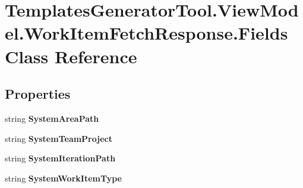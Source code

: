 \hypertarget{class_templates_generator_tool_1_1_view_model_1_1_work_item_fetch_response_1_1_fields}{}\section{Templates\+Generator\+Tool.\+View\+Model.\+Work\+Item\+Fetch\+Response.\+Fields Class Reference}
\label{class_templates_generator_tool_1_1_view_model_1_1_work_item_fetch_response_1_1_fields}
\subsection*{Properties}
\begin{DoxyCompactItemize}
\item 
\mbox{\label{class_templates_generator_tool_1_1_view_model_1_1_work_item_fetch_response_1_1_fields_a45623af0ca1600dc00d35269ee5b2209}} 
string {\bfseries System\+Area\+Path}
\item 
\mbox{\label{class_templates_generator_tool_1_1_view_model_1_1_work_item_fetch_response_1_1_fields_ab40188df9e1fa8177bb741265ed07ad4}} 
string {\bfseries System\+Team\+Project}
\item 
\mbox{\label{class_templates_generator_tool_1_1_view_model_1_1_work_item_fetch_response_1_1_fields_a78a514576cd11f399b6714617f1665e0}} 
string {\bfseries System\+Iteration\+Path}
\item 
\mbox{\label{class_templates_generator_tool_1_1_view_model_1_1_work_item_fetch_response_1_1_fields_af3184f4764f1accc54ea222cf5d6823b}} 
string {\bfseries System\+Work\+Item\+Type}

\end{DoxyCompactItemize}
